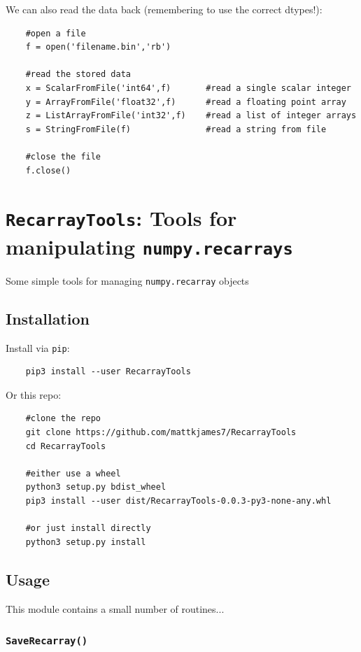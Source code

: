 	We can also read the data back (remembering to use the correct dtypes!):
	
	\begin{verbatim}
	#open a file
	f = open('filename.bin','rb')
	
	#read the stored data
	x = ScalarFromFile('int64',f)       #read a single scalar integer
	y = ArrayFromFile('float32',f)      #read a floating point array
	z = ListArrayFromFile('int32',f)    #read a list of integer arrays
	s = StringFromFile(f)               #read a string from file
	
	#close the file
	f.close()
	\end{verbatim}
	

	\section{\texttt{RecarrayTools}: Tools for manipulating \texttt{numpy.recarrays}}	


	Some simple tools for managing \texttt{numpy.recarray} objects
	
	\subsection{Installation}
	
	Install via \texttt{pip}:
	
	\begin{verbatim}
	pip3 install --user RecarrayTools
	\end{verbatim}
	
	Or this repo:
	
	\begin{verbatim}
	#clone the repo
	git clone https://github.com/mattkjames7/RecarrayTools
	cd RecarrayTools
	
	#either use a wheel
	python3 setup.py bdist_wheel
	pip3 install --user dist/RecarrayTools-0.0.3-py3-none-any.whl
	
	#or just install directly
	python3 setup.py install
	\end{verbatim}
	
	\subsection{Usage}
	
	This module contains a small number of routines...
	
	\subsubsection{\texttt{SaveRecarray()}}
	
